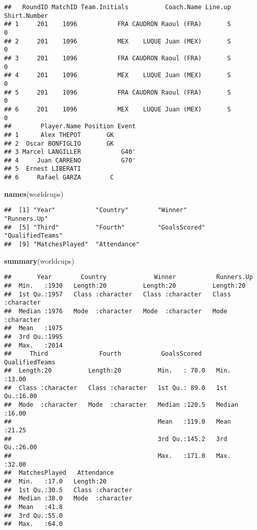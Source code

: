 \documentclass[]{article}
\newenvironment{Shaded}{\begin{snugshade}}{\end{snugshade}}
\newcommand{\KeywordTok}[1]{\textcolor[rgb]{0.13,0.29,0.53}{\textbf{#1}}}
\newcommand{\NormalTok}[1]{#1}
\begin{document}
\begin{verbatim}
##   RoundID MatchID Team.Initials          Coach.Name Line.up Shirt.Number
## 1     201    1096           FRA CAUDRON Raoul (FRA)       S            0
## 2     201    1096           MEX    LUQUE Juan (MEX)       S            0
## 3     201    1096           FRA CAUDRON Raoul (FRA)       S            0
## 4     201    1096           MEX    LUQUE Juan (MEX)       S            0
## 5     201    1096           FRA CAUDRON Raoul (FRA)       S            0
## 6     201    1096           MEX    LUQUE Juan (MEX)       S            0
##        Player.Name Position Event
## 1      Alex THEPOT       GK      
## 2  Oscar BONFIGLIO       GK      
## 3 Marcel LANGILLER           G40'
## 4     Juan CARRENO           G70'
## 5  Ernest LIBERATI               
## 6     Rafael GARZA        C
\end{verbatim}

\begin{Shaded}
\begin{Highlighting}[]
\KeywordTok{names}\NormalTok{(worldcups)}
\end{Highlighting}
\end{Shaded}

\begin{verbatim}
##  [1] "Year"           "Country"        "Winner"         "Runners.Up"    
##  [5] "Third"          "Fourth"         "GoalsScored"    "QualifiedTeams"
##  [9] "MatchesPlayed"  "Attendance"
\end{verbatim}

\begin{Shaded}
\begin{Highlighting}[]
\KeywordTok{summary}\NormalTok{(worldcups)}
\end{Highlighting}
\end{Shaded}

\begin{verbatim}
##       Year        Country             Winner           Runners.Up       
##  Min.   :1930   Length:20          Length:20          Length:20         
##  1st Qu.:1957   Class :character   Class :character   Class :character  
##  Median :1976   Mode  :character   Mode  :character   Mode  :character  
##  Mean   :1975                                                           
##  3rd Qu.:1995                                                           
##  Max.   :2014                                                           
##     Third              Fourth           GoalsScored    QualifiedTeams 
##  Length:20          Length:20          Min.   : 70.0   Min.   :13.00  
##  Class :character   Class :character   1st Qu.: 89.0   1st Qu.:16.00  
##  Mode  :character   Mode  :character   Median :120.5   Median :16.00  
##                                        Mean   :119.0   Mean   :21.25  
##                                        3rd Qu.:145.2   3rd Qu.:26.00  
##                                        Max.   :171.0   Max.   :32.00  
##  MatchesPlayed   Attendance       
##  Min.   :17.0   Length:20         
##  1st Qu.:30.5   Class :character  
##  Median :38.0   Mode  :character  
##  Mean   :41.8                     
##  3rd Qu.:55.0                     
##  Max.   :64.0
\end{verbatim}
\end{document}
